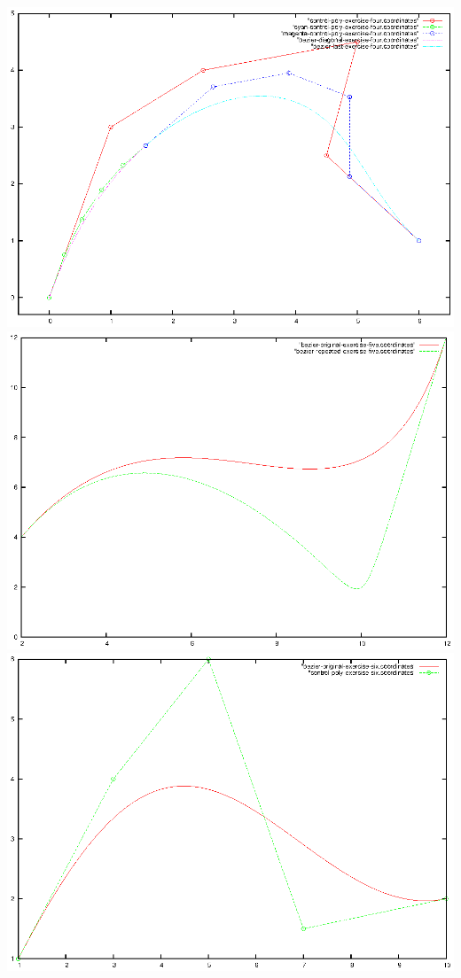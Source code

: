 \documentclass{article}
\begin{document}
\includegraphics{bezier-deCasteljau-curves/exercise-four}
\includegraphics{bezier-deCasteljau-curves/exercise-five}
\includegraphics{bezier-deCasteljau-curves/exercise-six-original}
\end{document}

